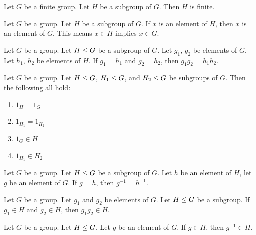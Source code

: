 \begin{theorem}
Let $G$ be a finite group. Let $H$ be a subgroup of $G$.
Then $H$ is finite.
\end{theorem}

\begin{theorem}
Let $G$ be a group. Let $H$ be a subgroup of $G$.
If $x$ is an element of $H$, then $x$ is an element of $G$.
This means $x\in H$ implies $x\in G$.
\end{theorem}

\begin{theorem}
Let $G$ be a group. Let $H\leq G$ be a subgroup of $G$.
Let $g_{1}$, $g_{2}$ be elements of $G$.
Let $h_{1}$, $h_{2}$ be elements of $H$.
If $g_{1}=h_{1}$ and $g_{2}=h_{2}$, then $g_{1}g_{2}=h_{1}h_{2}$.
\end{theorem}

\begin{theorem}
Let $G$ be a group.
Let $H\leq G$, $H_{1}\leq G$, and $H_{2}\leq G$ be subgroups of $G$.
Then the following all hold:
\begin{enumerate}
\item $1_{H}=1_{G}$
\item $1_{H_{1}}=1_{H_{2}}$
\item $1_{G}\in H$
\item $1_{H_{1}}\in H_{2}$
\end{enumerate}
\end{theorem}

\begin{theorem}
Let $G$ be a group.
Let $H\leq G$ be a subgroup of $G$.
Let $h$ be an element of $H$, let $g$ be an element of $G$.
If $g=h$, then $g^{-1}=h^{-1}$.
\end{theorem}

\begin{theorem}
Let $G$ be a group. Let $g_{1}$ and $g_{2}$ be elements of $G$.
Let $H\leq G$ be a subgroup.
If $g_{1}\in H$ and $g_{2}\in H$, then $g_{1}g_{2}\in H$.
\end{theorem}

\begin{theorem}
Let $G$ be a group. Let $H\leq G$. Let $g$ be an element of $G$.
If $g\in H$, then $g^{-1}\in H$.
\end{theorem}

